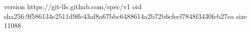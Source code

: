 version https://git-lfs.github.com/spec/v1
oid sha256:9f586134e2511d9ffc43af8a67bbc6488614a2b72b6cfecf7848f3430feb27ea
size 11088
